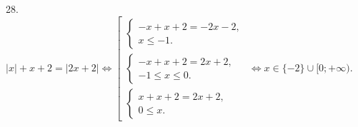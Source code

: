 28. $|x|+x+2=|2x+2|\Leftrightarrow \left[\begin{array}{l}\begin{cases} -x+x+2=-2x-2,\\ x\leqslant -1.\end{cases}\\
\begin{cases} -x+x+2=2x+2,\\ -1\leqslant x\leqslant 0 .\end{cases}\\\begin{cases} x+x+2=2x+2,\\ 0\leqslant x.\end{cases}\end{array}\right.\Leftrightarrow
x\in \{-2\}\cup[0;+\infty).$\\
